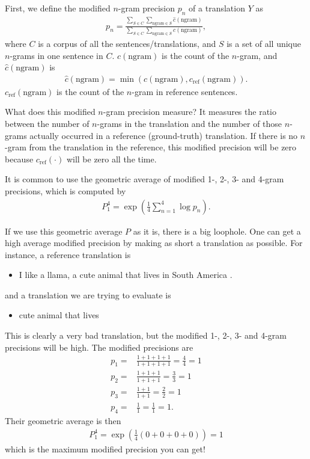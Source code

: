 \documentclass{report}
\begin{document}
First, we define the modified $n$-gram precision $p_n$ of a translation $Y$ as
\begin{align*}
    p_n = \frac{
        \sum_{S \in C} \sum_{\text{ngram} \in S} \hat{c}(\text{ngram})
    }
    {
        \sum_{S \in C} \sum_{\text{ngram} \in S} c(\text{ngram})
    },
\end{align*}
where $C$ is a corpus of all the sentences/translations, and $S$ is a set of all
unique $n$-grams in one sentence in $C$. $c(\text{ngram})$ is the count of the
$n$-gram, and $\hat{c}(\text{ngram})$ is
\begin{align*}
    \hat{c}(\text{ngram}) = \min(c(\text{ngram}), c_{\text{ref}}(\text{ngram})).
\end{align*}
$c_{\text{ref}}(\text{ngram})$ is the count of the $n$-gram in reference
sentences.

What does this modified $n$-gram precision measure? It measures the ratio
between the number of $n$-grams in the translation and the number of those
$n$-grams actually occurred in a reference (ground-truth) translation. If there
is no $n$-gram from the translation in the reference, this modified precision
will be zero because $c_{\text{ref}}(\cdot)$ will be zero all the time. 

It is common to use the geometric average of modified 1-, 2-, 3- and 4-gram
precisions, which is computed by
\begin{align*}
    P_1^4 = \exp\left( \frac{1}{4} \sum_{n=1}^4 \log p_n \right).
\end{align*}

If we use this geometric average $P$ as it is, there is a big loophole. One can
get a high average modified precision by making as short a translation as
possible. For instance, a reference translation is
\begin{itemize}
    \item I like a llama, a cute animal that lives in South America .
\end{itemize}
and a translation we are trying to evaluate is
\begin{itemize}
    \item cute animal that lives
\end{itemize}
This is clearly a very bad translation, but the modified 1-, 2-, 3- and 4-gram
precisions will be high. The modified precisions are
\begin{align*}
    p_1 =& \frac{1+1+1+1}{1+1+1+1} = \frac{4}{4} = 1 \\
    p_2 =& \frac{1+1+1}{1+1+1} = \frac{3}{3} = 1 \\
    p_3 =& \frac{1+1}{1+1} = \frac{2}{2} = 1 \\
    p_4 =& \frac{1}{1} = \frac{1}{1} = 1.
\end{align*}
Their geometric average is then
\begin{align*}
    P_1^4 = \exp\left( \frac{1}{4} \left( 0 + 0 + 0 + 0 \right)\right) = 1
\end{align*}
which is the maximum modified precision you can get!
\end{document}
